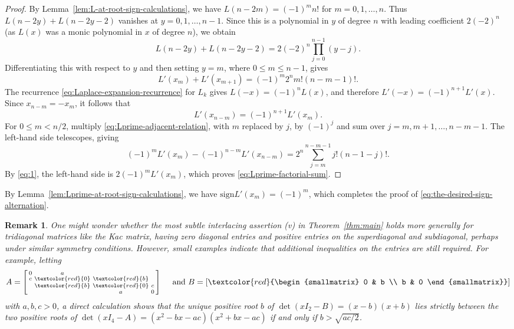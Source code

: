 \documentclass[10pt]{amsart}
\theoremstyle{plain}
\newtheorem{remark}[conjecture]{Remark}
\newcommand{\sign}{\mathrm{sign}}
\newcommand{\colorize}[1]{{\textcolor{red}{#1}}}
\begin{document}
\begin{proof}
  By Lemma~\ref{lem:L-at-root-sign-calculations}, we have
  \(L(n-2m)=(-1)^m n!\) for \(m=0,1,\ldots,n\). 
  Thus 
  $L(n-2y) + L(n-2y-2)$
  vanishes at \( y=0,1,\ldots,n-1\). Since
  this is a polynomial in $y$ of degree $n$  with leading
  coefficient \( 2(-2)^n \) (as $L(x)$ was a monic polynomial in $x$ of degree $n$), we obtain
\begin{equation}
\label{eq:P-finite-difference}
L(n-2y) + L(n-2y-2)
 =2(-2)^n\prod_{j=0}^{n-1}(y-j).
\end{equation}
Differentiating this with respect to $y$ and then setting \(y=m\), where \(0\leq m\leq n-1\), gives
\begin{equation}
\label{eq:Lprime-adjacent-relation}
 L'(x_m)+L'(x_{m+1})
 =(-1)^m2^n m!(n-m-1)!.
\end{equation}
The recurrence \eqref{eq:Laplace-expansion-recurrence} for \(L_k\) gives \(L(-x)=(-1)^nL(x)\), and therefore
\(L'(-x)=(-1)^{n+1}L'(x)\).  Since \(x_{n-m}=-x_m\), it follows that
\begin{equation}\label{eq:1}
 L'(x_{n-m})=(-1)^{n+1}L'(x_m).
\end{equation}
For \(0\leq m<n/2\), multiply
\eqref{eq:Lprime-adjacent-relation}, with \(m\) replaced by \(j\), by
\((-1)^j\) and sum over \(j=m,m+1,\ldots,n-m-1\).  The left-hand side
telescopes, giving
\[
 (-1)^mL'(x_m)-(-1)^{n-m}L'(x_{n-m})
 =2^n\sum_{j=m}^{n-m-1}j!(n-1-j)!.
\]
By \eqref{eq:1}, the left-hand side is
\(2(-1)^mL'(x_m)\), which proves \eqref{eq:Lprime-factorial-sum}.
\end{proof}

By Lemma~\ref{lem:Lprime-at-root-sign-calculations}, we have
$\sign L'(x_m)=(-1)^m$, which completes the proof of
\eqref{eq:the-desired-sign-alternation}.

\begin{remark} \rm
    One might wonder whether the most subtle interlacing assertion (v) in Theorem~\ref{thm:main} holds more generally for tridiagonal matrices like the Kac matrix, having zero diagonal entries and positive entries on the superdiagonal and subdiagonal, perhaps under similar symmetry conditions. However, small examples indicate that additional inequalities on the entries are still required.  For example, letting
$$
    A=\left[ \begin{smallmatrix}
        0 & a &  & \\
        c & \colorize{0} &\colorize{b} & \\
         & \colorize{b} & \colorize{0} & c\\
         &  & a & 0
\end{smallmatrix}\right]
\quad \text{ and }
B=\left[ \colorize {\begin{smallmatrix}
        0 & b \\
        b & 0 
\end{smallmatrix}}\right]
$$
with $a,b,c>0$, a direct calculation shows that the unique positive root $b$ of $\det(xI_2-B)=(x-b)(x+b)$ 
lies strictly between the
two positive roots of 
$\det(xI_4-A)=
(x^2-bx-ac)(x^2+bx-ac)$
if and only if $b > \sqrt{ac/2}$.
\end{remark}
\end{document}
